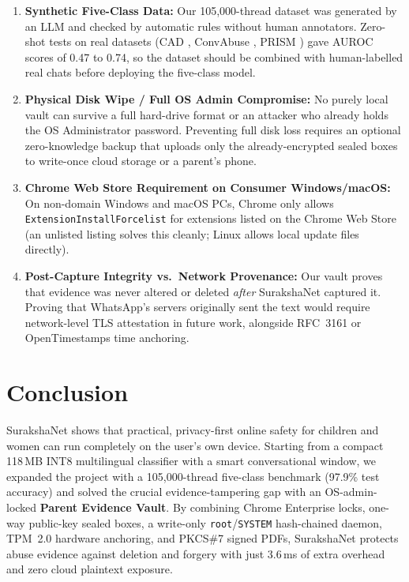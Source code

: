 \documentclass[11pt,a4paper]{article}
\begin{document}
\begin{enumerate}
  \item \textbf{Synthetic Five-Class Data:} Our 105{,}000-thread dataset was generated by an LLM and checked by automatic rules without human annotators. Zero-shot tests on real datasets (CAD \cite{vidgen2021cad}, ConvAbuse \cite{curry2021convabuse}, PRISM \cite{prism2025}) gave AUROC scores of 0.47 to 0.74, so the dataset should be combined with human-labelled real chats before deploying the five-class model.
  \item \textbf{Physical Disk Wipe / Full OS Admin Compromise:} No purely local vault can survive a full hard-drive format or an attacker who already holds the OS Administrator password. Preventing full disk loss requires an optional zero-knowledge backup that uploads only the already-encrypted sealed boxes to write-once cloud storage or a parent's phone.
  \item \textbf{Chrome Web Store Requirement on Consumer Windows/macOS:} On non-domain Windows and macOS PCs, Chrome only allows \texttt{ExtensionInstallForcelist} for extensions listed on the Chrome Web Store (an unlisted listing solves this cleanly; Linux allows local update files directly).
  \item \textbf{Post-Capture Integrity vs.\ Network Provenance:} Our vault proves that evidence was never altered or deleted \textit{after} SurakshaNet captured it. Proving that WhatsApp's servers originally sent the text would require network-level TLS attestation in future work, alongside RFC~3161 or OpenTimestamps time anchoring.
\end{enumerate}

\section{Conclusion}

SurakshaNet shows that practical, privacy-first online safety for children and women can run completely on the user's own device. Starting from a compact 118\,MB INT8 multilingual classifier with a smart conversational window, we expanded the project with a 105{,}000-thread five-class benchmark (97.9\% test accuracy) and solved the crucial evidence-tampering gap with an OS-admin-locked \textbf{Parent Evidence Vault}. By combining Chrome Enterprise locks, one-way public-key sealed boxes, a write-only \texttt{root}/\texttt{SYSTEM} hash-chained daemon, TPM~2.0 hardware anchoring, and PKCS\#7 signed PDFs, SurakshaNet protects abuse evidence against deletion and forgery with just 3.6\,ms of extra overhead and zero cloud plaintext exposure.



\end{document}
